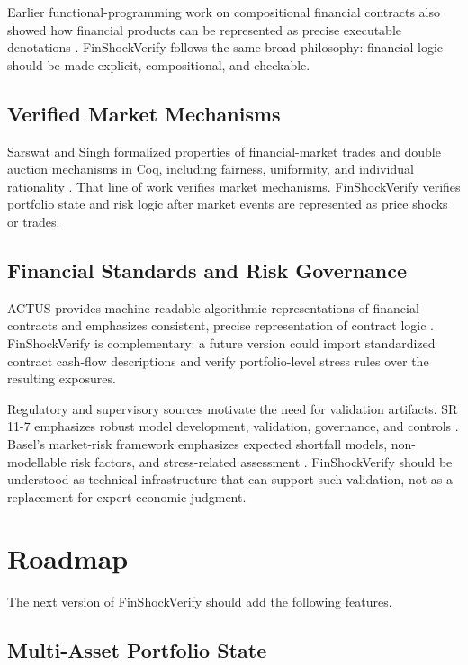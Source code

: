 \documentclass[11pt]{article}
\begin{document}
Earlier functional-programming work on compositional financial contracts also
showed how financial products can be represented as precise executable
denotations \cite{jones2000composing}. FinShockVerify follows the same broad
philosophy: financial logic should be made explicit, compositional, and
checkable.

\subsection{Verified Market Mechanisms}

Sarswat and Singh formalized properties of financial-market trades and double
auction mechanisms in Coq, including fairness, uniformity, and individual
rationality \cite{sarswat2020verifiedtrades}. That line of work verifies
market mechanisms. FinShockVerify verifies portfolio state and risk logic after
market events are represented as price shocks or trades.

\subsection{Financial Standards and Risk Governance}

ACTUS provides machine-readable algorithmic representations of financial
contracts and emphasizes consistent, precise representation of contract logic
\cite{actusfrf}. FinShockVerify is complementary: a future version could import
standardized contract cash-flow descriptions and verify portfolio-level stress
rules over the resulting exposures.

Regulatory and supervisory sources motivate the need for validation artifacts.
SR 11-7 emphasizes robust model development, validation, governance, and
controls \cite{fed2011sr117}. Basel's market-risk framework emphasizes
expected shortfall models, non-modellable risk factors, and stress-related
assessment \cite{basel2019marketrisk}. FinShockVerify should be understood as
technical infrastructure that can support such validation, not as a replacement
for expert economic judgment.

\section{Roadmap}

The next version of FinShockVerify should add the following features.

\subsection{Multi-Asset Portfolio State}
\end{document}
